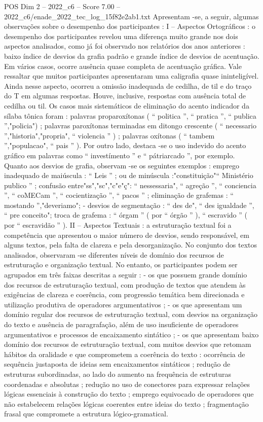 \begin{textsample}{POS Dim 2 – 2022\_c6 – Score 7.00 – 2022\_c6/enade\_2022\_tec\_log\_15f82e2ab1.txt}
Apresentam -se, a seguir, algumas observações sobre o desempenho dos participantes : I – Aspectos Ortográficos : o desempenho dos participantes revelou uma diferença muito grande nos dois aspectos analisados, como já foi observado nos relatórios dos anos anteriores : baixo índice de desvios da grafia padrão e grande índice de desvios de acentuação.
Em vários casos, ocorre ausência quase completa de acentuação gráfica.
Vale ressaltar que muitos participantes apresentaram uma caligrafia quase ininteligível.
Ainda nesse aspecto, ocorreu a omissão inadequada de cedilha, de til e do traço do T em algumas respostas.
Houve, inclusive, respostas com ausência total de cedilha ou til.
Os casos mais sistemáticos de eliminação do acento indicador da sílaba tônica foram : palavras proparoxítonas ( “ politica ”, “ pratica ”, “ publica ”,"policia") ; palavras paroxítonas terminadas em ditongo crescente ( “ necessario ”,"historia","propria", “ violencia ” ) ; palavras oxítonas ( “ tambem ”,"populacao", “ pais ” ).
Por outro lado, destaca -se o uso indevido do acento gráfico em palavras como “ investímento ” e “ pátriarcado ”, por exemplo.
Quanto aos desvios de grafia, observam -se os seguintes exemplos : emprego inadequado de maiúscula : “ Leis ” ; ou de minúscula :"constituição"“ Ministério publico ” ; confusão entre"ss","sc","c"e"ç": “ nessessaria", “ agreção ”, “ conciencia ”, “ coMECam ”, “ cocientização ”, “ pacos ” ; eliminação de grafemas : “ mostando ”,"deveriamo"; - desvios de segmentação : “ des de", “ des igualdade ”, “ pre conceito"; troca de grafema : “ órgam ” ( por “ órgão ” ), “ escravido ” ( por “ escravidão ” ).
II – Aspectos Textuais : a estruturação textual foi a competência que apresentou o maior número de desvios, sendo responsável, em alguns textos, pela falta de clareza e pela desorganização.
No conjunto dos textos analisados, observaram -se diferentes níveis de domínio dos recursos de estruturação e organização textual.
No entanto, os participantes podem ser agrupados em três faixas descritas a seguir : - os que possuem grande domínio dos recursos de estruturação textual, com produção de textos que atendem às exigências de clareza e coerência, com progressão temática bem direcionada e utilização produtiva de operadores argumentativos ; - os que apresentam um domínio regular dos recursos de estruturação textual, com desvios na organização do texto e ausência de paragrafação, além de uso insuficiente de operadores argumentativos e processos de encaixamento sintático ; - os que apresentam baixo domínio dos recursos de estruturação textual, com muitos desvios que retomam hábitos da oralidade e que comprometem a coerência do texto : ocorrência de sequência justaposta de ideias sem encaixamentos sintáticos ; redução de estruturas subordinadas, ao lado do aumento na frequência de estruturas coordenadas e absolutas ; redução no uso de conectores para expressar relações lógicas essenciais à construção do texto ; emprego equivocado de operadores que não estabelecem relações lógicas coerentes entre ideias do texto ; fragmentação frasal que compromete a estrutura lógico-gramatical.

\end{textsample}
